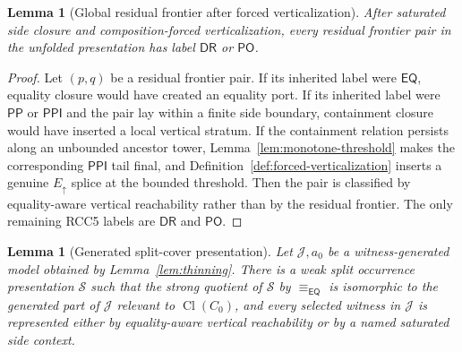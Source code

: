 \documentclass[11pt]{article}
\newtheorem{lemma}[theorem]{Lemma}
\newcommand{\EQ}{\mathsf{EQ}}
\newcommand{\DR}{\mathsf{DR}}
\newcommand{\PO}{\mathsf{PO}}
\newcommand{\PP}{\mathsf{PP}}
\newcommand{\PPI}{\mathsf{PPI}}
\newcommand{\Cl}{\operatorname{Cl}}
\newcommand{\J}{\mathcal J}
\newcommand{\eqc}{\equiv_{\EQ}}
\begin{document}
\begin{lemma}[Global residual frontier after forced verticalization]\label{lem:global-residual-frontier}
After saturated side closure and composition-forced verticalization, every residual frontier pair in the unfolded presentation has label $\DR$ or $\PO$.
\end{lemma}

\begin{proof}
Let $(p,q)$ be a residual frontier pair.  If its inherited label were $\EQ$, equality closure would have created an equality port.  If its inherited label were $\PP$ or $\PPI$ and the pair lay within a finite side boundary, containment closure would have inserted a local vertical stratum.  If the containment relation persists along an unbounded ancestor tower, Lemma~\ref{lem:monotone-threshold} makes the corresponding $\PPI$ tail final, and Definition~\ref{def:forced-verticalization} inserts a genuine $E_{\uparrow}$ splice at the bounded threshold.  Then the pair is classified by equality-aware vertical reachability rather than by the residual frontier.  The only remaining RCC5 labels are $\DR$ and $\PO$.
\end{proof}

\begin{lemma}[Generated split-cover presentation]\label{lem:split-cover}
Let $\J,a_0$ be a witness-generated model obtained by Lemma~\ref{lem:thinning}.  There is a weak split occurrence presentation $\mathcal S$ such that the strong quotient of $\mathcal S$ by $\eqc$ is isomorphic to the generated part of $\J$ relevant to $\Cl(C_0)$, and every selected witness in $\J$ is represented either by equality-aware vertical reachability or by a named saturated side context.
\end{lemma}
\end{document}
